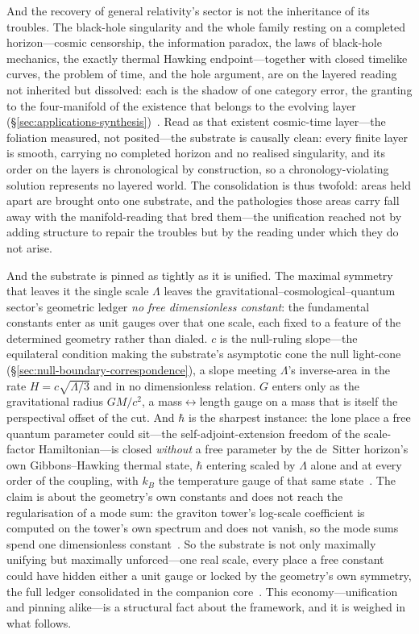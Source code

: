 \documentclass[11pt,a4paper]{article}
\theoremstyle{plain}
\theoremstyle{definition}
\theoremstyle{remark}
\begin{document}
And the recovery of general relativity's sector is not the inheritance of its troubles. The black-hole singularity and the whole family resting on a completed horizon---cosmic censorship, the information paradox, the laws of black-hole mechanics, the exactly thermal Hawking endpoint---together with closed timelike curves, the problem of time, and the hole argument, are on the layered reading not inherited but dissolved: each is the shadow of one category error, the granting to the four-manifold of the existence that belongs to the evolving layer (\S\ref{sec:applications-synthesis})~\cite{JanzenBHcausality}. Read as that existent cosmic-time layer---the foliation measured, not posited---the substrate is causally clean: every finite layer is smooth, carrying no completed horizon and no realised singularity, and its order on the layers is chronological by construction, so a chronology-violating solution represents no layered world. The consolidation is thus twofold: areas held apart are brought onto one substrate, and the pathologies those areas carry fall away with the manifold-reading that bred them---the unification reached not by adding structure to repair the troubles but by the reading under which they do not arise.

And the substrate is pinned as tightly as it is unified. The maximal symmetry that leaves it the single scale $\Lambda$ leaves the gravitational--cosmological--quantum sector's geometric ledger \emph{no free dimensionless constant}: the fundamental constants enter as unit gauges over that one scale, each fixed to a feature of the determined geometry rather than dialed. $c$ is the null-ruling slope---the equilateral condition making the substrate's asymptotic cone the null light-cone (\S\ref{sec:null-boundary-correspondence}), a slope meeting $\Lambda$'s inverse-area in the rate $H=c\sqrt{\Lambda/3}$ and in no dimensionless relation. $G$ enters only as the gravitational radius $GM/c^{2}$, a mass$\leftrightarrow$length gauge on a mass that is itself the perspectival offset of the cut. And $\hbar$ is the sharpest instance: the lone place a free quantum parameter could sit---the self-adjoint-extension freedom of the scale-factor Hamiltonian---is closed \emph{without} a free parameter by the de~Sitter horizon's own Gibbons--Hawking thermal state, $\hbar$ entering scaled by $\Lambda$ alone and at every order of the coupling, with $k_B$ the temperature gauge of that same state~\cite{JanzenCanonicalTime}. The claim is about the geometry's own constants and does not reach the regularisation of a mode sum: the graviton tower's log-scale coefficient is computed on the tower's own spectrum and does not vanish, so the mode sums spend one dimensionless constant~\cite{JanzenCanonicalTime}. So the substrate is not only maximally unifying but maximally unforced---one real scale, every place a free constant could have hidden either a unit gauge or locked by the geometry's own symmetry, the full ledger consolidated in the companion core~\cite{JanzenGeometricCore}. This economy---unification and pinning alike---is a structural fact about the framework, and it is weighed in what follows.
\end{document}
